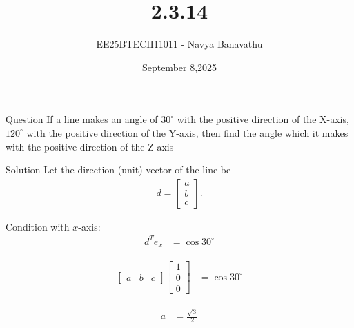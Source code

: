 \documentclass{beamer}
\title{2.3.14}
\date{September 8,2025}
\author{EE25BTECH11011 - Navya Banavathu}
\begin{document}
\frame{\titlepage}

\begin{frame}{Question}
If a line makes an angle of $30^\circ$ with the positive direction of the X-axis, $120^\circ$  with the positive direction of the Y-axis, then find the angle which it makes with the positive direction of the Z-axis
\end{frame}

\begin{frame}{Solution}
Let the direction (unit) vector of the line be
\begin{align}  
d = \begin{bmatrix} a \\ b \\ c \end{bmatrix}.
\end{align}

Condition with $x$-axis:
\begin{align}
d^T e_x &= \cos 30^\circ 
\end{align}

\begin{align}
\begin{bmatrix} a & b & c \end{bmatrix}
\begin{bmatrix} 1 \\ 0 \\ 0 \end{bmatrix} &= \cos 30^\circ 
\end{align}

\begin{align}
a &= \tfrac{\sqrt{3}}{2} 
\end{align}
\end{frame}
\end{document}
